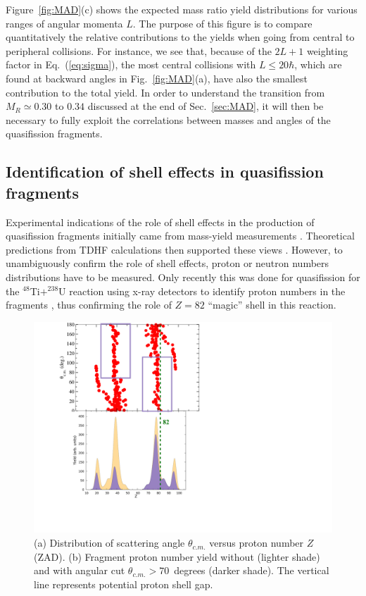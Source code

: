 Figure~\ref{fig:MAD}(c) shows the expected mass ratio yield distributions for various ranges of angular momenta $L$.
The purpose of this figure is to compare quantitatively the relative contributions to the yields when going from central to peripheral collisions.
For instance, we see that, because of the $2L+1$ weighting factor in Eq.~(\ref{eq:sigma}), the most central collisions with $L\le20\hbar$, which are found at backward angles in Fig.~\ref{fig:MAD}(a), have also the smallest contribution to the total yield.
In order to understand the transition from $M_R\simeq0.30$ to $0.34$ discussed at the end of Sec.~\ref{sec:MAD}, it will then be necessary to fully exploit the correlations between  masses and angles of the quasifission fragments.


\subsection{Identification of shell effects in quasifission fragments}\label{sec:shell}

Experimental indications of the role of shell effects in the production of quasifission fragments initially came from mass-yield measurements \citep{itkis2004,nishio2008,wakhle2014}.
Theoretical predictions from TDHF calculations then supported these views \citep{wakhle2014,oberacker2014,umar2016}.
However, to unambiguously confirm the role of shell effects, proton or neutron numbers distributions have to be measured.
Only recently this was done for quasifission for the $^{48}$Ti$+^{238}$U reaction using  x-ray detectors to identify proton numbers in the fragments \citep{morjean2017}, thus confirming the role of $Z=82$ ``magic'' shell in this reaction.

\begin{figure}
	\centerline{\includegraphics*[width=\textwidth]{../Figures/CaBk/ZAD.pdf}}
	\caption{(a) Distribution of scattering angle $\theta_{c.m.}$ versus proton number $Z$ (ZAD). (b) Fragment proton number yield without (lighter shade) and with angular cut $\theta_{c.m.}>70$~degrees (darker shade). The vertical line represents potential proton shell gap.}
	\label{fig:ZAD}
\end{figure}

